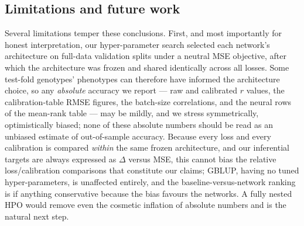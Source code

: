 \subsection{Limitations and future work}
Several limitations temper these conclusions. First, and most importantly for
honest interpretation, our hyper-parameter search selected each network's
architecture on full-data validation splits under a neutral MSE objective, after
which the architecture was frozen and shared identically across all losses. Some
test-fold genotypes' phenotypes can therefore have informed the architecture
choice, so any \emph{absolute} accuracy we report --- raw and calibrated $r$
values, the calibration-table RMSE figures, the batch-size correlations, and the
neural rows of the mean-rank table --- may be mildly, and we stress symmetrically,
optimistically biased; none of these absolute numbers should be read as an
unbiased estimate of out-of-sample accuracy. Because every loss and every
calibration is compared \emph{within} the same frozen architecture, and our
inferential targets are always expressed as $\Delta$ versus MSE, this cannot bias
the relative loss/calibration comparisons that constitute our claims; GBLUP, having
no tuned hyper-parameters, is unaffected entirely, and the baseline-versus-network
ranking is if anything conservative because the bias favours the networks. A fully
nested HPO would remove even the cosmetic inflation of absolute numbers and is the
natural next step.

